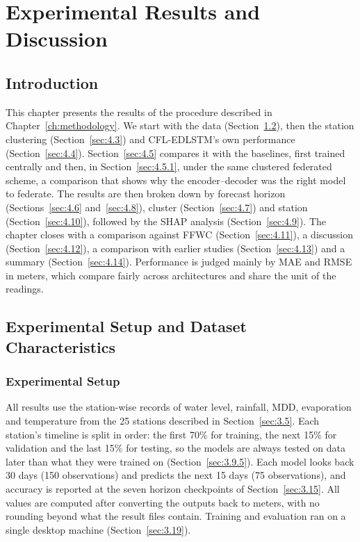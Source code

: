 

\chapter{Experimental Results and Discussion}
\label{Ch_Chapter4}
\label{ch:results}

\section{Introduction}
\label{sec:4.1}

This chapter presents the results of the procedure described in
Chapter~\ref{ch:methodology}. We start with the data (Section~\ref{sec:4.2}),
then the station clustering (Section~\ref{sec:4.3}) and CFL-EDLSTM's own
performance (Section~\ref{sec:4.4}). Section~\ref{sec:4.5} compares it with the
baselines, first trained centrally and then, in Section~\ref{sec:4.5.1}, under
the same clustered federated scheme, a comparison that shows why the
encoder--decoder was the right model to federate. The results are then broken
down by forecast horizon (Sections~\ref{sec:4.6} and~\ref{sec:4.8}), cluster
(Section~\ref{sec:4.7}) and station (Section~\ref{sec:4.10}), followed by the
SHAP analysis (Section~\ref{sec:4.9}). The chapter closes with a comparison
against FFWC (Section~\ref{sec:4.11}), a discussion (Section~\ref{sec:4.12}), a
comparison with earlier studies (Section~\ref{sec:4.13}) and a summary
(Section~\ref{sec:4.14}). Performance is judged mainly by MAE and RMSE in meters,
which compare fairly across architectures and share the unit of the readings.

\section{Experimental Setup and Dataset Characteristics}
\label{sec:4.2}

\subsection{Experimental Setup}
\label{sec:4.2.1}

All results use the station-wise records of water level, rainfall, MDD,
evaporation and temperature from the 25 stations described in
Section~\ref{sec:3.5}. Each station's timeline is split in order: the first 70\%
for training, the next 15\% for validation and the last 15\% for testing, so the
models are always tested on data later than what they were trained on
(Section~\ref{sec:3.9.5}). Each model looks back 30 days (150 observations) and
predicts the next 15 days (75 observations), and accuracy is reported at the
seven horizon checkpoints of Section~\ref{sec:3.15}. All values are computed
after converting the outputs back to meters, with no rounding beyond what the
result files contain. Training and evaluation ran on a single desktop machine
(Section~\ref{sec:3.19}).

